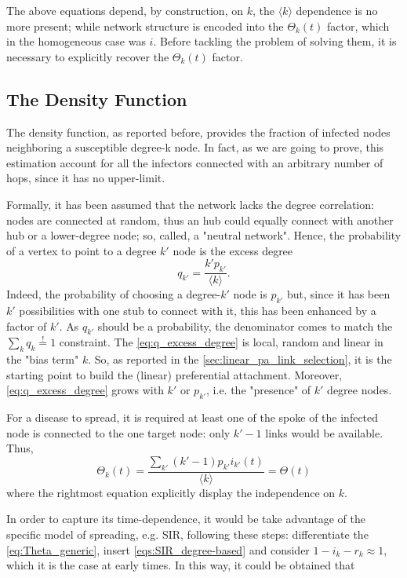 \documentclass[a4paper,10pt,twoside]{book} %
\theoremstyle{definition}
\begin{document}
The above equations depend, by construction, on $k$, the $\langle k \rangle$ dependence is no more present; while network structure is encoded into the $\Theta_k(t)$ factor, which in the homogeneous case was $i$.
Before tackling the problem of solving them, it is necessary to explicitly recover the $\Theta_k(t)$ factor.

\subsection*{The Density Function}
The density function, as reported before, provides the fraction of infected nodes neighboring a susceptible degree-k node. In fact, as we are going to prove, this estimation account for all the infectors connected with an arbitrary number of hops, since it has no upper-limit. 

Formally, it has been assumed that the network lacks the degree correlation: nodes are connected at random, thus an hub could equally connect with another hub or a lower-degree node; so, called, a "neutral network". Hence, the probability of a vertex to point to a degree $k'$ node is the excess degree
\begin{equation}
	q_{k'} = \frac{k' p_{k'}}{\langle k \rangle}
	\label{eq:q_excess_degree}
	.
\end{equation}
Indeed, the probability of choosing a degree-$k'$ node is $p_{k'}$ but, since it has been $k'$ possibilities with one stub to connect with it, this has been enhanced by a factor of $k'$. As $q_{k'}$ should be a probability, the denominator comes to match the $\sum_k q_k \stackrel{!}{=} 1$ constraint.
The \autoref{eq:q_excess_degree} is local, random and linear in the "bias term" $k$. So, as reported in the \autoref{sec:linear_pa_link_selection}, it is the starting point to build the (linear) preferential attachment. Moreover, \autoref{eq:q_excess_degree} grows with $k'$ or $p_{k'}$, i.e. the "presence" of $k'$ degree nodes.

For a disease to spread, it is required at least one of the spoke of the infected node is connected to the one target node: only $k'-1$ links would be available.
Thus,
\begin{equation}
	\Theta_k(t) = \frac{\sum_{k'} (k'-1)p_{k'}i_{k'}(t)}{\langle k \rangle} = \Theta(t)
	\label{eq:Theta_generic}
\end{equation}
where the rightmost equation explicitly display the independence on $k$.

In order to capture its time-dependence, it would be take advantage of the specific model of spreading, e.g. SIR, following these steps: differentiate the \autoref{eq:Theta_generic}, insert \autoref{eqs:SIR_degree-based} and consider $1-i_k-r_k \approx 1$, which it is the case at early times. In this way, it could be obtained that \cite{barabasi::2016networkbook}
\end{document}
